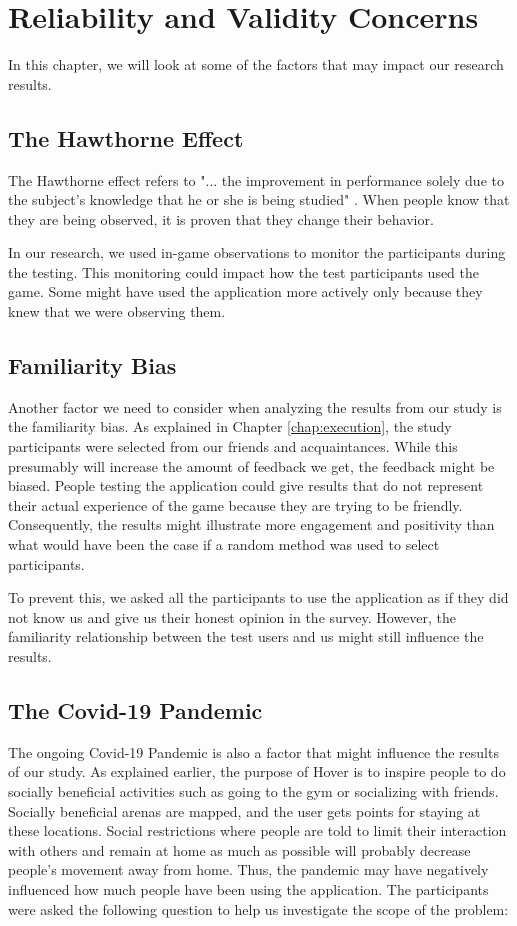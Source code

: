 \section{Reliability and Validity Concerns}
\label{chap:reliability_and_validity}
In this chapter, we will look at some of the factors that may impact our research results.

\subsection{The Hawthorne Effect}
The Hawthorne effect refers to "... the improvement in performance solely due to the subject's knowledge that he or she is being studied" \citep{fox_clinical_2008}. When people know that they are being observed, it is proven that they change their behavior. 

In our research, we used in-game observations to monitor the participants during the testing. This monitoring could impact how the test participants used the game. Some might have used the application more actively only because they knew that we were observing them.

\subsection{Familiarity Bias}
Another factor we need to consider when analyzing the results from our study is the familiarity bias. As explained in Chapter \ref{chap:execution}, the study participants were selected from our friends and acquaintances. While this presumably will increase the amount of feedback we get, the feedback might be biased. People testing the application could give results that do not represent their actual experience of the game because they are trying to be friendly. Consequently, the results might illustrate more engagement and positivity than what would have been the case if a random method was used to select participants.

To prevent this, we asked all the participants to use the application as if they did not know us and give us their honest opinion in the survey. However, the familiarity relationship between the test users and us might still influence the results.

\subsection{The Covid-19 Pandemic}
The ongoing Covid-19 Pandemic is also a factor that might influence the results of our study. As explained earlier, the purpose of Hover is to inspire people to do socially beneficial activities such as going to the gym or socializing with friends. Socially beneficial arenas are mapped, and the user gets points for staying at these locations. Social restrictions where people are told to limit their interaction with others and remain at home as much as possible will probably decrease people’s movement away from home. Thus, the pandemic may have negatively influenced how much people have been using the application. The participants were asked the following question to help us investigate the scope of the problem: 

